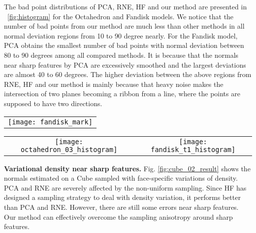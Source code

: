 The bad point distributions of PCA, RNE, HF and our method are presented in \fig~\ref{fig:histogram} for the Octahedron and Fandisk models. We notice that the number of bad points from our method are much less than other methods in all normal deviation regions from 10 to 90 degree nearly.
%
For the Fandisk model, PCA obtains the smallest number of bad points with normal deviation between 80 to 90 degrees among all compared methods. It is because that the normals near sharp features by PCA are excessively smoothed and the largest deviations are almost 40 to 60 degrees.
%
%
The higher deviation between the above regions from RNE, HF and our method is mainly because that heavy noise makes the intersection of two planes becoming a ribbon from a line, where the points are supposed to have two directions.

\begin{figure*}[htbp]
\begin{center}
    \begin{tabular}{c}
        \texttt{[image: fandisk\_mark]}\\
    \end{tabular}
    \caption{Comparison for Fandisk model with $50\%$ noise. From top to bottom row are the results rendering using surfels, the visualization of bad points and top view of the generated normals, respectively. Left to right are the results of PCA, RNE, HF and our algorithm, respectively.\label{fig:fandisk_01_result}}
\end{center}
\end{figure*}

\begin{figure*}[htbp]
\begin{center}
    \begin{tabular}{c c}
        \texttt{[image: octahedron\_03\_histogram]} &
        \texttt{[image: fandisk\_t1\_histogram]}
    \end{tabular}
    \caption{The histograms of the normal deviation on Octahedron model (left) and Fandisk model (right) shown in \fig \ref{fig:octahedron_03_result} and \fig \ref{fig:fandisk_01_result}, respectively.\label{fig:histogram}}
\end{center}
\end{figure*}

\textbf{Variational density near sharp features.}
Fig. \ref{fig:cube_02_result}  shows the normals estimated on a Cube sampled with face-specific
variations of density. PCA and RNE are severely affected by the non-uniform sampling. Since HF has designed a sampling strategy to deal with density variation, it performs better than PCA and RNE. However, there are still some errors near sharp features. Our method can effectively overcome the sampling anisotropy around sharp features.

